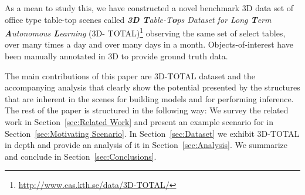 \documentclass[letterpaper, 10 pt, conference]{ieeeconf}  %
\begin{document}
As a mean to study this, we have constructed a novel benchmark 3D data set of office type 
table-top scenes called \textit{\textbf{3D T}able-T\textbf{o}ps Dataset for Long \textbf{T}erm \textbf{A}utonomous \textbf{L}earning} (3D-
TOTAL)\footnote{\url{http://www.cas.kth.se/data/3D-TOTAL/}} observing the same set of select tables, over many times a day and over many 
days in a month. Objects-of-interest have been manually annotated in 3D to provide ground truth data. 

The main contributions of this paper are 3D-TOTAL dataset and the accompanying analysis that clearly show the potential presented by the 
structures that are inherent in the scenes for building models and for performing inference. 
The rest of the paper is structured in the following way: We survey the related work in Section~\ref{sec:Related Work} and present an 
example scenario for in Section~\ref{sec:Motivating Scenario}. In Section~\ref{sec:Dataset} we exhibit 3D-TOTAL in depth and provide an 
analysis of it in Section~\ref{sec:Analysis}. We summarize and conclude in Section~\ref{sec:Conclusions}.


\end{document}

